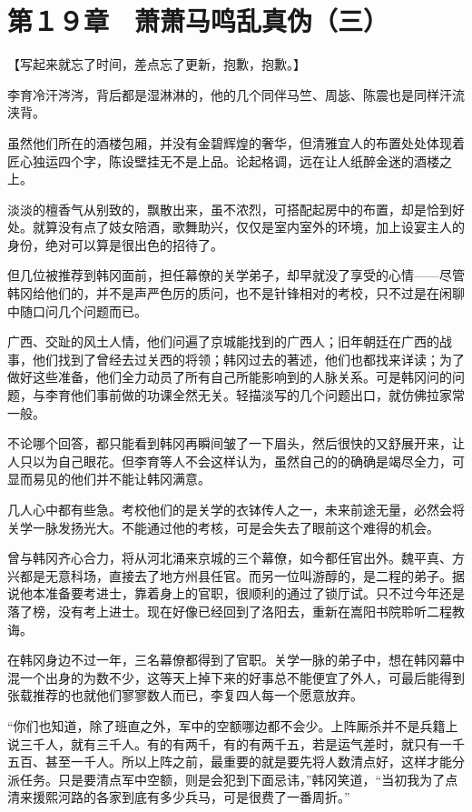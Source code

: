 \section{第１９章　萧萧马鸣乱真伪（三）}

【写起来就忘了时间，差点忘了更新，抱歉，抱歉。】

李育冷汗涔涔，背后都是湿淋淋的，他的几个同伴马竺、周毖、陈震也是同样汗流浃背。

虽然他们所在的酒楼包厢，并没有金碧辉煌的奢华，但清雅宜人的布置处处体现着匠心独运四个字，陈设壁挂无不是上品。论起格调，远在让人纸醉金迷的酒楼之上。

淡淡的檀香气从别致的，飘散出来，虽不浓烈，可搭配起房中的布置，却是恰到好处。就算没有点了妓女陪酒，歌舞助兴，仅仅是室内室外的环境，加上设宴主人的身份，绝对可以算是很出色的招待了。

但几位被推荐到韩冈面前，担任幕僚的关学弟子，却早就没了享受的心情——尽管韩冈给他们的，并不是声严色厉的质问，也不是针锋相对的考校，只不过是在闲聊中随口问几个问题而已。

广西、交趾的风土人情，他们问遍了京城能找到的广西人；旧年朝廷在广西的战事，他们找到了曾经去过关西的将领；韩冈过去的著述，他们也都找来详读；为了做好这些准备，他们全力动员了所有自己所能影响到的人脉关系。可是韩冈问的问题，与李育他们事前做的功课全然无关。轻描淡写的几个问题出口，就仿佛拉家常一般。

不论哪个回答，都只能看到韩冈再瞬间皱了一下眉头，然后很快的又舒展开来，让人只以为自己眼花。但李育等人不会这样认为，虽然自己的的确确是竭尽全力，可显而易见的他们并不能让韩冈满意。

几人心中都有些急。考校他们的是关学的衣钵传人之一，未来前途无量，必然会将关学一脉发扬光大。不能通过他的考核，可是会失去了眼前这个难得的机会。

曾与韩冈齐心合力，将从河北涌来京城的三个幕僚，如今都任官出外。魏平真、方兴都是无意科场，直接去了地方州县任官。而另一位叫游醇的，是二程的弟子。据说他本准备要考进士，靠着身上的官职，很顺利的通过了锁厅试。只不过今年还是落了榜，没有考上进士。现在好像已经回到了洛阳去，重新在嵩阳书院聆听二程教诲。

在韩冈身边不过一年，三名幕僚都得到了官职。关学一脉的弟子中，想在韩冈幕中混一个出身的为数不少，这等天上掉下来的好事总不能便宜了外人，可最后能得到张载推荐的也就他们寥寥数人而已，李复四人每一个愿意放弃。

“你们也知道，除了班直之外，军中的空额哪边都不会少。上阵厮杀并不是兵籍上说三千人，就有三千人。有的有两千，有的有两千五，若是运气差时，就只有一千五百、甚至一千人。所以上阵之前，最重要的就是要先将人数清点好，这样才能分派任务。只是要清点军中空额，则是会犯到下面忌讳，”韩冈笑道，“当初我为了点清来援熙河路的各家到底有多少兵马，可是很费了一番周折。”

